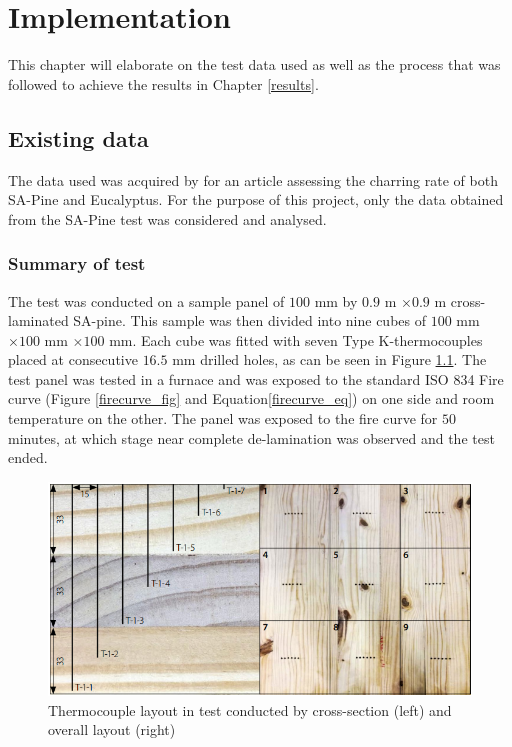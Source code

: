\chapter{Implementation} \label{implementation}
This chapter will elaborate on the test data used as well as the process that was followed to achieve the results in Chapter \ref{results}.
\section{Existing data}
The data used was acquired by \cite{Westhuyzen:2020} for an article assessing the charring rate of both SA-Pine and Eucalyptus.
	For the purpose of this project, only the data obtained from the SA-Pine test was considered and analysed. 
	\subsection{Summary of test}
	The test was conducted on a sample panel of $100$ mm by $0.9$ m $\times 0.9$ m cross-laminated SA-pine.
	This sample was then divided into nine cubes of $100$ mm $\times 100$ mm $\times 100$ mm.
	Each cube was fitted with seven Type K-thermocouples placed at consecutive $16.5$ mm drilled holes, as can be seen in Figure \ref{TC_layout}. 
	The test panel was tested in a furnace and was exposed to the standard ISO 834 Fire curve (Figure \ref{firecurve_fig} and Equation\ref{firecurve_eq}) on one side and room temperature on the other. 
	The panel was exposed to the fire curve for $50$ minutes, at which stage near complete de-lamination was observed and the test ended.
	\begin{figure}
	\centering
	\includegraphics[width=0.75\linewidth]{figures/TC_layout.png}
	\caption{Thermocouple layout in test conducted by \cite{Westhuyzen:2020} cross-section (left) and overall layout (right)}
	\label{TC_layout}
	\end{figure}
